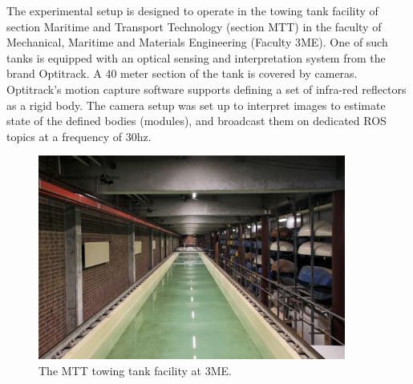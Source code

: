 The experimental setup is designed to operate in the towing tank facility of section Maritime and Transport Technology (section MTT) in the faculty of Mechanical, Maritime and Materials Engineering (Faculty 3ME). One of such tanks is equipped with an optical sensing and interpretation system from the brand Optitrack. A 40 meter section of the tank is covered by cameras. Optitrack's motion capture software supports defining a set of infra-red reflectors as a rigid body. The camera setup was set up to interpret images to estimate state of the defined bodies (modules), and broadcast them on dedicated ROS topics at a frequency of 30hz. 

\begin{figure}[h!]
	\centering
	\captionsetup{justification=centering}
	\includegraphics[width=0.9\textwidth]{img/IMG_4805b_downsized}
	\caption{The MTT towing tank facility at 3ME.}
\end{figure}


